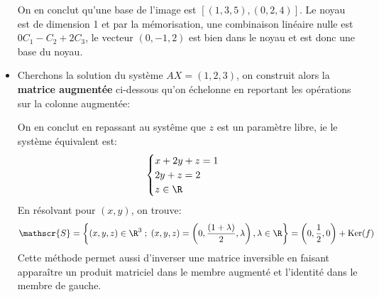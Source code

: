 \begin{itemize}
\[   \]
   On en conclut qu'une base de l'image est \([(1, 3, 5), (0, 2, 4)]\).\+
   Le noyau est de dimension 1 et par la mémorisation, une combinaison linéaire nulle est \(0C_1-C_2+2C_3\), le vecteur \((0, -1, 2)\) est bien dans le noyau et est donc une base du noyau.
   \item Cherchons la solution du système \( AX = (1, 2, 3) \), on construit alors la \textbf{matrice augmentée} ci-dessous qu'on échelonne en reportant les opérations sur la colonne augmentée:
   \begin{center}
   \end{center}
   On en conclut en repassant au systême que \( z \) est un paramètre libre, ie le système équivalent est:
   \[ 
      \begin{cases}
         x + 2y + z = 1\\
         2y + z = 2\\
         z \in \R 
      \end{cases} 
   \] 
   En résolvant pour \( (x, y) \), on trouve:
   \[ 
      \mathscr{S} = \left\{ (x, y, z) \in \R^3 \; ; \; (x, y, z) = \left(0, \frac{(1 + \lambda)}{2}, \lambda \right) , \lambda \in \R\right\} = \left(0, \frac{1}{2}, 0 \right) + \text{Ker}(f)
   \]
   Cette méthode permet aussi d'inverser une matrice inversible en faisant apparaître un produit matriciel dans le membre augmenté et l'identité dans le membre de gauche.
\end{itemize}
